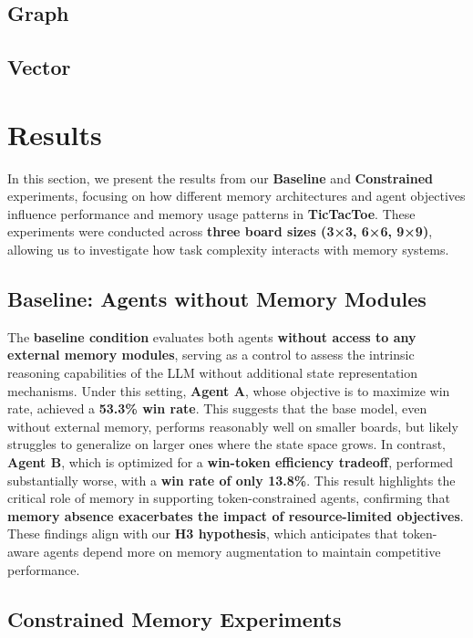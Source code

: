 \documentclass[12pt]{article}
\begin{document}
\subsection{Graph}
\subsection{Vector}


\section{Results}

In this section, we present the results from our \textbf{Baseline} and \textbf{Constrained} experiments, focusing on how different memory architectures and agent objectives influence performance and memory usage patterns in \textbf{TicTacToe}. These experiments were conducted across \textbf{three board sizes (3×3, 6×6, 9×9)}, allowing us to investigate how task complexity interacts with memory systems.

\subsection{Baseline: Agents without Memory Modules}

The \textbf{baseline condition} evaluates both agents \textbf{without access to any external memory modules}, serving as a control to assess the intrinsic reasoning capabilities of the LLM without additional state representation mechanisms. Under this setting, \textbf{Agent A}, whose objective is to maximize win rate, achieved a \textbf{53.3\% win rate}. This suggests that the base model, even without external memory, performs reasonably well on smaller boards, but likely struggles to generalize on larger ones where the state space grows. In contrast, \textbf{Agent B}, which is optimized for a \textbf{win-token efficiency tradeoff}, performed substantially worse, with a \textbf{win rate of only 13.8\%}. This result highlights the critical role of memory in supporting token-constrained agents, confirming that \textbf{memory absence exacerbates the impact of resource-limited objectives}. These findings align with our \textbf{H3 hypothesis}, which anticipates that token-aware agents depend more on memory augmentation to maintain competitive performance.

\subsection{Constrained Memory Experiments}
\end{document}
